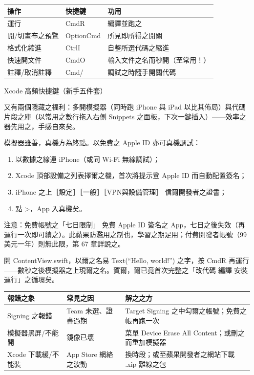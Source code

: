 \begin{center}
\begin{tabularx}{\linewidth}{|X|X|X|}
\hline
\textbf{操作} & \textbf{快捷鍵} & \textbf{功用} \tabularnewline
\hline
運行 & CmdR & 編譯並跑之 \tabularnewline
開/切畫布之預覽 & OptionCmd & 所見即所得之開關 \tabularnewline
格式化縮進 & CtrlI & 自整所選代碼之縮進 \tabularnewline
快速開文件 & CmdO & 輸入文件之名而秒開（至常用！） \tabularnewline
註釋/取消註釋 & Cmd/ & 調試之時隨手開關代碼 \tabularnewline
\hline
\end{tabularx}
\end{center}

\begin{center}\small\color{gray}Xcode 高頻快捷鍵（新手五件套）\end{center}

又有兩個隱藏之福利：多開模擬器（同時跑 iPhone 與 iPad 以比其佈局）與代碼片段之庫（以常用之數行拖入右側 Snippets 之面板，下次一鍵插入）——效率之器先用之，手感自來矣。


模擬器雖善，真機方為終點。以免費之 Apple ID 亦可真機調試：

\begin{enumerate}
  \item 以數據之線連 iPhone（或同 Wi-Fi 無線調試）；
  \item Xcode 頂部設備之列表擇爾之機，首次將提示登 Apple ID 而自動配置簽名；
  \item iPhone 之上［設定］［一般］［VPN與設備管理］ 信爾開發者之證書；
  \item 點 >，App 入真機矣。
\end{enumerate}

\begin{tcbwarn}{注意：免費帳號之「七日限制」}
免費 Apple ID 簽名之 App，七日之後失效（再運行一次即可續之）。此蘋果防濫用之制也，學習之期足用；付費開發者帳號（99 美元一年）則無此限，第 67 章詳說之。

\end{tcbwarn}



開 ContentView.swift，以爾之名易 Text(“Hello, world!”) 之字，按 CmdR 再運行——數秒之後模擬器之上現爾之名。賀爾，爾已竟首次完整之「改代碼 編譯 安裝 運行」之循環矣。

\begin{center}
\begin{tabularx}{\linewidth}{|X|X|X|}
\hline
\textbf{報錯之象} & \textbf{常見之因} & \textbf{解之之方} \tabularnewline
\hline
Signing 之報錯 & Team 未選、證書過期 & Target Signing 之中勾爾之帳號；免費之帳再跑一次 \tabularnewline
模擬器黑屏/不能開 & 鏡像已壞 & 菜單 Device Erase All Content；或刪之而重加模擬器 \tabularnewline
Xcode 下載緩/不能裝 & App Store 網絡之波動 & 換時段；或至蘋果開發者之網站下載 .xip 離線之包 \tabularnewline
\hline
\end{tabularx}
\end{center}

